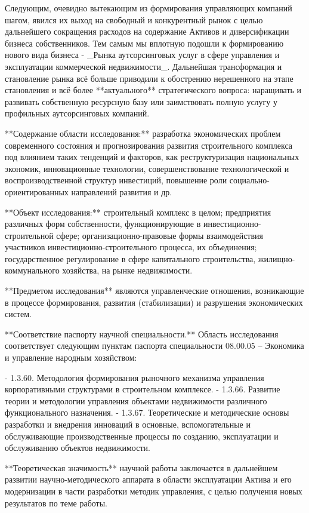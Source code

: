 Следующим, очевидно вытекающим из формирования управляющих компаний шагом, явился их выход на свободный и конкурентный рынок с целью дальнейшего сокращения расходов на содержание Активов и диверсификации бизнеса собственников. Тем самым мы вплотную подошли к формированию нового вида бизнеса - _Рынка аутсорсинговых услуг в сфере управления и эксплуатации коммерческой недвижимости_. Дальнейшая трансформация и становление рынка всё больше приводили к обострению нерешенного на этапе становления и всё более **актуального** стратегического вопроса: наращивать и развивать собственную ресурсную базу или заимствовать полную услугу у профильных аутсорсинговых компаний.


**Содержание области исследования:** разработка экономических проблем современного состояния и прогнозирования развития строительного комплекса под влиянием таких тенденций и факторов, как реструктуризация национальных экономик, инновационные технологии, совершенствование технологической и воспроизводственной структур инвестиций, повышение роли социально-ориентированных направлений развития и др.

**Объект исследования:** строительный комплекс в целом; предприятия различных форм собственности, функционирующие в инвестиционно- строительной сфере; организационно-правовые формы взаимодействия участников инвестиционно-строительного процесса, их объединения;
государственное регулирование в сфере капитального строительства, жилищно-коммунального хозяйства, на рынке недвижимости.

**Предметом исследования** являются управленческие отношения, возникающие в процессе формирования, развития (стабилизации) и разрушения экономических систем.

**Соответствие паспорту научной специальности.** Область исследования соответствует следующим пунктам паспорта специальности 08.00.05 – Экономика и управление народным хозяйством:

- 1.3.60. Методология формирования рыночного механизма управления корпоративными структурами в строительном комплексе.
- 1.3.66. Развитие теории и методологии управления объектами недвижимости различного функционального назначения.
- 1.3.67. Теоретические и методические основы разработки и внедрения инноваций в основные, вспомогательные и обслуживающие производственные процессы по созданию, эксплуатации и обслуживанию объектов недвижимости.

**Теоретическая значимость** научной работы заключается в дальнейшем развитии научно-методического аппарата в области эксплуатации Актива и его модернизации в части разработки методик управления, с целью получения новых результатов по теме работы.
